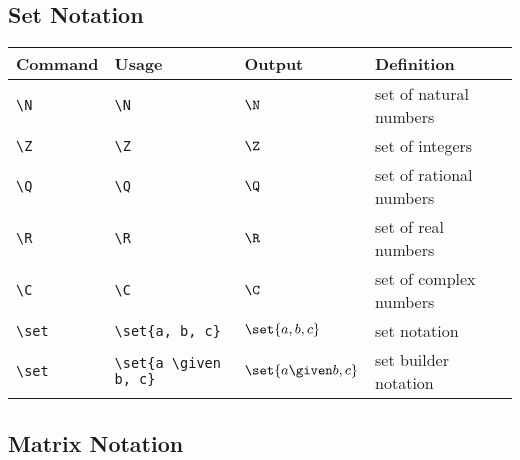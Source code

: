 \documentclass[11pt]{article}
\begin{document}
\subsection{Set Notation}

\begin{tabular}{llll}
    Command     & Usage                      & Output                & Definition              \\
    \hline
    \verb|\N|   & \verb|\N|                  & $\N$                  & set of natural numbers  \\
    \verb|\Z|   & \verb|\Z|                  & $\Z$                  & set of integers         \\
    \verb|\Q|   & \verb|\Q|                  & $\Q$                  & set of rational numbers \\
    \verb|\R|   & \verb|\R|                  & $\R$                  & set of real numbers     \\
    \verb|\C|   & \verb|\C|                  & $\C$                  & set of complex numbers  \\
    \verb|\set| & \verb|\set{a, b, c}|       & $\set{a, b, c}$       & set notation            \\
    \verb|\set| & \verb|\set{a \given b, c}| & $\set{a \given b, c}$ & set builder notation    \\
\end{tabular}

\subsection{Matrix Notation}
\end{document}
